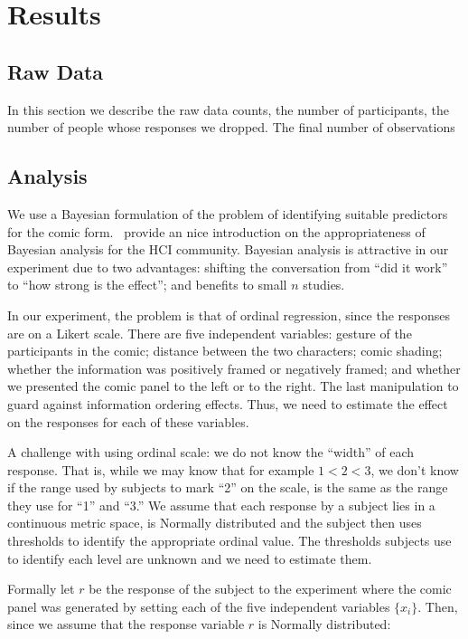 
\section{Results}
\label{sec:Results}

\subsection{Raw Data}
\label{sub:Raw Data}
In this section we describe the raw data counts, the number of participants, the number of people whose responses we dropped. The final number of observations

\subsection{Analysis}
\label{sub:Analysis}
We use a Bayesian formulation of the problem of identifying suitable predictors for the comic form.~\textcite{Kay2016} provide an nice introduction on the appropriateness of Bayesian analysis for the HCI community. Bayesian analysis is attractive in our experiment due to two advantages: shifting the conversation from ``did it work'' to ``how strong is the effect''; and benefits to small $n$ studies.

In our experiment, the problem is that of ordinal regression, since the responses are on a Likert scale. There are five independent variables: gesture of the participants in the comic;  distance between the two characters; comic shading; whether the information was positively framed or negatively framed; and whether we presented the comic panel to the left or to the right. The last manipulation to guard against information ordering effects. Thus, we need to estimate the effect on the responses for each of these variables.

A challenge with using ordinal scale: we do not know the ``width'' of each response. That is, while we may know that for example $1<2<3$, we don't know if the range used by subjects to mark ``2'' on the scale, is the same as the range they use for ``1'' and ``3.''  We assume that each response by a subject lies in a continuous metric space, is Normally distributed and the subject then uses thresholds to identify the appropriate ordinal value. The thresholds subjects use to identify each level are unknown and we need to estimate them.


Formally let $r$ be the response of the subject to the experiment where the comic panel was generated by setting each of the five independent variables $\{x_i\}$. Then, since we assume that the response variable $r$ is Normally distributed:

